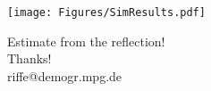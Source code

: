 \documentclass[20pt,usenames,dvipsnames]{beamer}
\begin{document}
\begin{frame}[plain]
\Large
\begin{center}
\texttt{[image: Figures/SimResults.pdf]}
\end{center}
\end{frame}

{
\begin{frame}
\vspace{9cm}
\Large
\begin{center}
Estimate from the reflection!\\ Thanks! \\
riffe@demogr.mpg.de
\end{center}
\end{frame}
}

\end{document}

